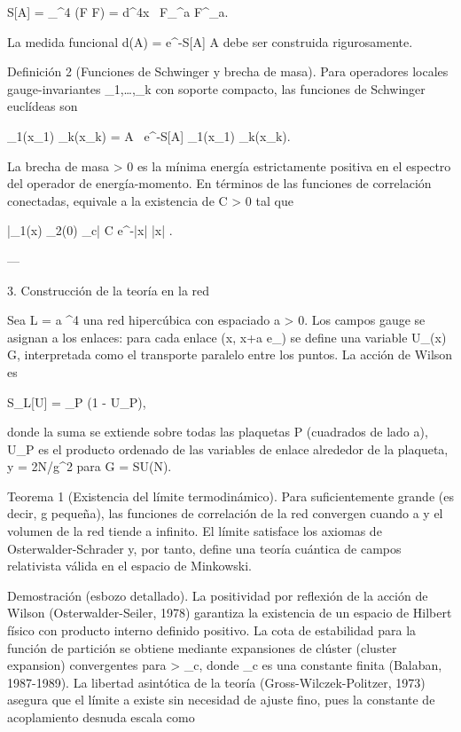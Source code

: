 \documentclass[12pt,twoside]{book}
\begin{document}
S[A] =  \int_{^4} (F \wedge *F) =  \int d^4x \, F_{\mu\nu}^a F^{\mu\nu}_a.

La medida funcional d\mu(A) = e^{-S[A]} A debe ser construida rigurosamente.

Definición 2 (Funciones de Schwinger y brecha de masa). Para operadores locales gauge-invariantes _1,\dots,_k con soporte compacto, las funciones de Schwinger euclídeas son

\langle {}_1(x_1) \cdots {}_k(x_k) \rangle =  \int {}A \, e^{-S[A]} _1(x_1) \cdots {}_k(x_k).

La brecha de masa \Delta > 0 es la mínima energía estrictamente positiva en el espectro del operador de energía-momento. En términos de las funciones de correlación conectadas, equivale a la existencia de C > 0 tal que

|\langle {}_1(x) _2(0) \rangle_c| \le C e^{-\Delta |x|} \quad {} |x| \to \infty.

---

3. Construcción de la teoría en la red

Sea L = a ^4 una red hipercúbica con espaciado a > 0. Los campos gauge se asignan a los enlaces: para cada enlace (x, x+a e_\mu) se define una variable U_\mu(x) \in G, interpretada como el transporte paralelo entre los puntos. La acción de Wilson es

S_L[U] = \beta \sum_P  (1 - U_P),

donde la suma se extiende sobre todas las plaquetas P (cuadrados de lado a), U_P es el producto ordenado de las variables de enlace alrededor de la plaqueta, y \beta = 2N/g^2 para G = SU(N).

Teorema 1 (Existencia del límite termodinámico). Para \beta suficientemente grande (es decir, g pequeña), las funciones de correlación de la red convergen cuando a  y el volumen de la red tiende a infinito. El límite satisface los axiomas de Osterwalder-Schrader y, por tanto, define una teoría cuántica de campos relativista válida en el espacio de Minkowski.

Demostración (esbozo detallado). La positividad por reflexión de la acción de Wilson (Osterwalder-Seiler, 1978) garantiza la existencia de un espacio de Hilbert físico con producto interno definido positivo. La cota de estabilidad para la función de partición se obtiene mediante expansiones de clúster (cluster expansion) convergentes para \beta > \beta_c, donde \beta_c es una constante finita (Balaban, 1987-1989). La libertad asintótica de la teoría (Gross-Wilczek-Politzer, 1973) asegura que el límite a  existe sin necesidad de ajuste fino, pues la constante de acoplamiento desnuda escala como
\end{document}
